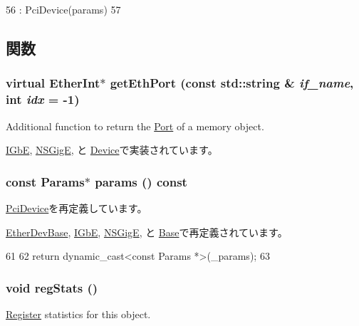 \begin{DoxyCode}
56         : PciDevice(params)
57     {}
\end{DoxyCode}


\subsection{関数}
\hypertarget{classEtherDevice_ac1aa24c1f8c0f1ee8bdc3f3d3799f67c}{
\subsubsection[{getEthPort}]{\setlength{\rightskip}{0pt plus 5cm}virtual {\bf EtherInt}$\ast$ getEthPort (const std::string \& {\em if\_\-name}, \/  int {\em idx} = {\ttfamily -\/1})}}
\label{classEtherDevice_ac1aa24c1f8c0f1ee8bdc3f3d3799f67c}
Additional function to return the \hyperlink{classPort}{Port} of a memory object. 

\hyperlink{classIGbE_a10260c5a583c0894dcdcd1ced50a53ae}{IGbE}, \hyperlink{classNSGigE_a10260c5a583c0894dcdcd1ced50a53ae}{NSGigE}, と \hyperlink{classSinic_1_1Device_a10260c5a583c0894dcdcd1ced50a53ae}{Device}で実装されています。\hypertarget{classEtherDevice_acd3c3feb78ae7a8f88fe0f110a718dff}{
\subsubsection[{params}]{\setlength{\rightskip}{0pt plus 5cm}const {\bf Params}$\ast$ params () const}}
\label{classEtherDevice_acd3c3feb78ae7a8f88fe0f110a718dff}


\hyperlink{classPciDevice_acd3c3feb78ae7a8f88fe0f110a718dff}{PciDevice}を再定義しています。

\hyperlink{classEtherDevBase_a24c177ef5d1124c3ff3e68a7e53532cf}{EtherDevBase}, \hyperlink{classIGbE_acd3c3feb78ae7a8f88fe0f110a718dff}{IGbE}, \hyperlink{classNSGigE_acd3c3feb78ae7a8f88fe0f110a718dff}{NSGigE}, と \hyperlink{classSinic_1_1Base_acd3c3feb78ae7a8f88fe0f110a718dff}{Base}で再定義されています。


\begin{DoxyCode}
61     {
62         return dynamic_cast<const Params *>(_params);
63     }
\end{DoxyCode}
\hypertarget{classEtherDevice_a4dc637449366fcdfc4e764cdf12d9b11}{
\subsubsection[{regStats}]{\setlength{\rightskip}{0pt plus 5cm}void regStats ()}}
\label{classEtherDevice_a4dc637449366fcdfc4e764cdf12d9b11}
\hyperlink{classRegister}{Register} statistics for this object. 

